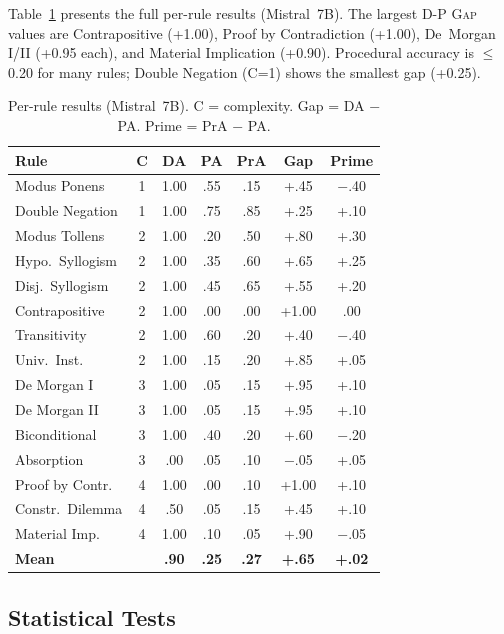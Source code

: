 \documentclass[11pt]{article}
\newcommand{\dpgap}{\textsc{D-P Gap}}
\begin{document}
Table~\ref{tab:per_rule} presents the full per-rule results (Mistral~7B).
The largest \dpgap{} values are Contrapositive (+1.00), Proof by
Contradiction (+1.00), De~Morgan I/II (+0.95 each), and Material
Implication (+0.90).
Procedural accuracy is $\leq$ 0.20 for many rules; Double Negation
(C=1) shows the smallest gap (+0.25).

\begin{table}[t]
\centering
\small
\begin{tabular}{lcccccc}
\toprule
\textbf{Rule} & \textbf{C} & \textbf{DA} & \textbf{PA} & \textbf{PrA} & \textbf{Gap} & \textbf{Prime} \\
\midrule
Modus Ponens      & 1 & 1.00 & .55 & .15 & +.45 & $-$.40 \\
Double Negation   & 1 & 1.00 & .75 & .85 & +.25 & +.10 \\
Modus Tollens     & 2 & 1.00 & .20 & .50 & +.80 & +.30 \\
Hypo.\ Syllogism  & 2 & 1.00 & .35 & .60 & +.65 & +.25 \\
Disj.\ Syllogism  & 2 & 1.00 & .45 & .65 & +.55 & +.20 \\
Contrapositive    & 2 & 1.00 & .00 & .00 & +1.00 & .00 \\
Transitivity      & 2 & 1.00 & .60 & .20 & +.40 & $-$.40 \\
Univ.\ Inst.      & 2 & 1.00 & .15 & .20 & +.85 & +.05 \\
De Morgan I       & 3 & 1.00 & .05 & .15 & +.95 & +.10 \\
De Morgan II      & 3 & 1.00 & .05 & .15 & +.95 & +.10 \\
Biconditional     & 3 & 1.00 & .40 & .20 & +.60 & $-$.20 \\
Absorption        & 3 & .00 & .05 & .10 & $-$.05 & +.05 \\
Proof by Contr.   & 4 & 1.00 & .00 & .10 & +1.00 & +.10 \\
Constr.\ Dilemma  & 4 & .50 & .05 & .15 & +.45 & +.10 \\
Material Imp.     & 4 & 1.00 & .10 & .05 & +.90 & $-$.05 \\
\midrule
\textbf{Mean}     &   & \textbf{.90} & \textbf{.25} & \textbf{.27} & \textbf{+.65} & \textbf{+.02} \\
\bottomrule
\end{tabular}
\caption{Per-rule results (Mistral~7B). C = complexity. Gap = DA $-$ PA. Prime = PrA $-$ PA.}
\label{tab:per_rule}
\end{table}

\subsection{Statistical Tests}
\end{document}
